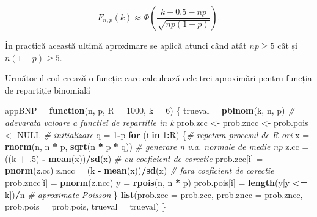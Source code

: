 \documentclass[]{article}
\newenvironment{Shaded}{\begin{snugshade}}{\end{snugshade}}
\newcommand{\KeywordTok}[1]{\textcolor[rgb]{0.13,0.29,0.53}{\textbf{#1}}}
\newcommand{\DataTypeTok}[1]{\textcolor[rgb]{0.13,0.29,0.53}{#1}}
\newcommand{\DecValTok}[1]{\textcolor[rgb]{0.00,0.00,0.81}{#1}}
\newcommand{\StringTok}[1]{\textcolor[rgb]{0.31,0.60,0.02}{#1}}
\newcommand{\CommentTok}[1]{\textcolor[rgb]{0.56,0.35,0.01}{\textit{#1}}}
\newcommand{\OtherTok}[1]{\textcolor[rgb]{0.56,0.35,0.01}{#1}}
\newcommand{\ControlFlowTok}[1]{\textcolor[rgb]{0.13,0.29,0.53}{\textbf{#1}}}
\newcommand{\OperatorTok}[1]{\textcolor[rgb]{0.81,0.36,0.00}{\textbf{#1}}}
\newcommand{\NormalTok}[1]{#1}
\begin{document}
\[
F_{n,p}(k) \approx \Phi\left(\frac{k+0.5-np}{\sqrt{np(1-p)}}\right).
\]

În practică această ultimă aproximare se aplică atunci când atât
\(np\geq 5\) cât și \(n(1-p)\geq 5\).

Următorul cod crează o funcție care calculează cele trei aproximări
pentru funcția de repartiție binomială

\begin{Shaded}
\begin{Highlighting}[]
\NormalTok{appBNP =}\StringTok{ }\ControlFlowTok{function}\NormalTok{(n, p, }\DataTypeTok{R =} \DecValTok{1000}\NormalTok{, }\DataTypeTok{k =} \DecValTok{6}\NormalTok{) \{}
\NormalTok{  trueval =}\StringTok{ }\KeywordTok{pbinom}\NormalTok{(k, n, p) }\CommentTok{# adevarata valoare a functiei de repartitie in k}
\NormalTok{  prob.zcc <-}\StringTok{ }\NormalTok{prob.zncc <-}\StringTok{ }\NormalTok{prob.pois <-}\StringTok{ }\OtherTok{NULL}  \CommentTok{# initializare}
\NormalTok{  q =}\StringTok{ }\DecValTok{1}\OperatorTok{-}\NormalTok{p}
  \ControlFlowTok{for}\NormalTok{ (i }\ControlFlowTok{in} \DecValTok{1}\OperatorTok{:}\NormalTok{R) \{}\CommentTok{# repetam procesul de R ori }
\NormalTok{    x =}\StringTok{ }\KeywordTok{rnorm}\NormalTok{(n, n }\OperatorTok{*}\StringTok{ }\NormalTok{p, }\KeywordTok{sqrt}\NormalTok{(n }\OperatorTok{*}\StringTok{ }\NormalTok{p }\OperatorTok{*}\StringTok{ }\NormalTok{q)) }\CommentTok{# generare n v.a. normale de medie np }
\NormalTok{    z.cc =}\StringTok{ }\NormalTok{((k }\OperatorTok{+}\StringTok{ }\NormalTok{.}\DecValTok{5}\NormalTok{) }\OperatorTok{-}\StringTok{ }\KeywordTok{mean}\NormalTok{(x))}\OperatorTok{/}\KeywordTok{sd}\NormalTok{(x) }\CommentTok{# cu coeficient de corectie}
\NormalTok{    prob.zcc[i] =}\StringTok{ }\KeywordTok{pnorm}\NormalTok{(z.cc)}
\NormalTok{    z.ncc =}\StringTok{ }\NormalTok{(k }\OperatorTok{-}\StringTok{ }\KeywordTok{mean}\NormalTok{(x))}\OperatorTok{/}\KeywordTok{sd}\NormalTok{(x) }\CommentTok{# fara coeficient de corectie}
\NormalTok{    prob.zncc[i] =}\StringTok{ }\KeywordTok{pnorm}\NormalTok{(z.ncc)    }
\NormalTok{    y =}\StringTok{ }\KeywordTok{rpois}\NormalTok{(n, n }\OperatorTok{*}\StringTok{ }\NormalTok{p)}
\NormalTok{    prob.pois[i] =}\StringTok{ }\KeywordTok{length}\NormalTok{(y[y }\OperatorTok{<=}\StringTok{ }\NormalTok{k])}\OperatorTok{/}\NormalTok{n }\CommentTok{# aproximate Poisson}
\NormalTok{  \}}
  \KeywordTok{list}\NormalTok{(}\DataTypeTok{prob.zcc =}\NormalTok{ prob.zcc, }\DataTypeTok{prob.zncc =}\NormalTok{ prob.zncc, }
       \DataTypeTok{prob.pois =}\NormalTok{ prob.pois, }\DataTypeTok{trueval =}\NormalTok{ trueval)}
\NormalTok{\}}
\end{Highlighting}
\end{Shaded}
\end{document}
